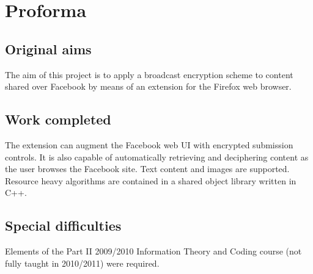 
\bigskip

\begingroup
\let\clearpage\relax
\let\cleardoublepage\relax
\let\cleardoublepage\relax
\chapter*{Proforma}


\section*{Original aims}

The aim of this project is to apply a broadcast encryption scheme to content shared over Facebook by means of an extension for the Firefox web browser.


\section*{Work completed}

The extension can augment the Facebook web UI with encrypted submission controls. It is also capable of automatically retrieving and deciphering content as the user browses the Facebook site. Text content and images are supported. Resource heavy algorithms are contained in a shared object library written in C++.


\section*{Special difficulties}

Elements of the Part II 2009/2010 Information Theory and Coding course (not fully taught in 2010/2011) were required.

\endgroup



